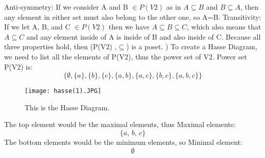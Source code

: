 \documentclass{article}
\begin{document}
Anti-symmetry: 
If we consider A and B \( \in P(V2) \) as in $A \subseteq B$ and $B \subseteq A$, then any element in either set must also belong to the other one, so A=B.
\newline \newline
Transitivity: 
If we let A, B, and C \( \in P(V2) \) then we have $A \subseteq B \subseteq C$, which also means that $A \subseteq C$ and any element inside of A is inside of B and also inside of C. 
\newline \newline
Because all three properties hold, then (P(V2) ,$ \subseteq $)  is a poset.
\newline{}) 
To create a Hasse Diagram, we need to list all the elements of P(V2), thus the power set of V2. 
\newline\newline
Power set P(V2) is: \[
\{\emptyset, \{a\}, \{b\}, \{c\}, \{a, b\}, \{a, c\}, \{b, c\}, \{a, b, c\}\}\]
\newline \newline
\begin{figure}[h]
    \centering
    \texttt{[image: hasse(1).JPG]}
    \caption{This is the Hasse Diagram.}
    \label{fig:example}
\end{figure}\newline
\newline\newline
The top element would be the maximal elements, thus
Maximal elements: \[\{a,\,b,\,c\}\]\newline
The bottom elements would be the minimum elements, so 
Minimal element: \[\emptyset\]
\end{document}
